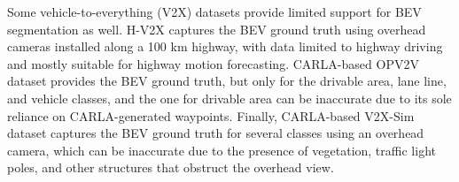 Some vehicle-to-everything (V2X) datasets provide limited support for BEV segmentation as well. H-V2X \cite{liu2025h} captures the BEV ground truth using overhead cameras installed along a 100 km highway, with data limited to highway driving and mostly suitable for highway motion forecasting. CARLA-based OPV2V \cite{xu2022opv2v} dataset provides the BEV ground truth, but only for the drivable area, lane line, and vehicle classes, and the one for drivable area can be inaccurate due to its sole reliance on CARLA-generated waypoints. Finally, CARLA-based V2X-Sim \cite{li2022v2x} dataset captures the BEV ground truth for several classes using an overhead camera, which can be inaccurate due to the presence of vegetation, traffic light poles, and other structures that obstruct the overhead view.